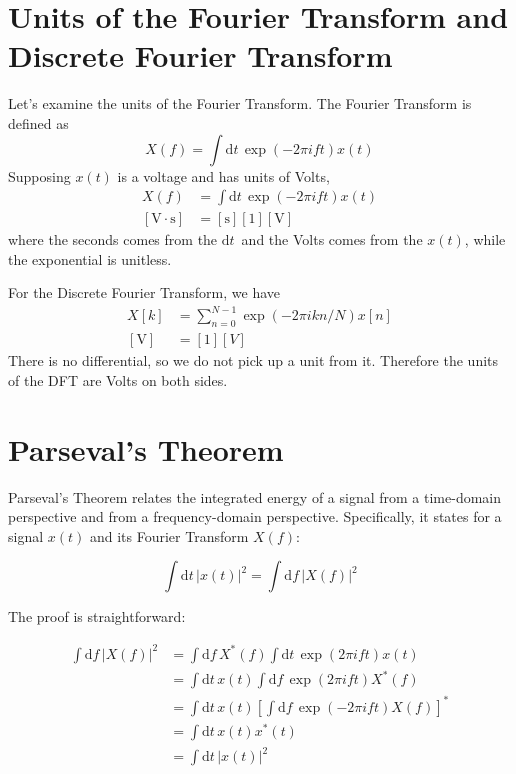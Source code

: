 \documentclass{article}
\newcommand{\dd}[1]{\mathrm{d}#1\,}
\begin{document}
\appendix
\section{Units of the Fourier Transform and Discrete Fourier Transform}\label{appendix:units}

Let's examine the units of the Fourier Transform. The Fourier Transform is
defined as
%
\[X(f) = \int \dd{t} \exp \left(-2\pi i ft\right) x(t)\]
%
Supposing \(x(t)\) is a voltage and has units of Volts,
%
\begin{align*}
    X(f) &= \int \dd{t} \exp \left(-2\pi i ft\right) x(t) \\
    \left[\mathrm{V}\cdot \mathrm{s}\right] &= \left[\mathrm{s}\right] \left[1\right] \left[\mathrm{V}\right]
\end{align*}
%
where the seconds comes from the \(\dd{t}\) and the Volts comes from the \(x(t)\),
while the exponential is unitless.

For the Discrete Fourier Transform, we have
%
\begin{align*}
    X[k] &= \sum_{n=0}^{N-1} \exp\left(-2\pi i kn/N\right) x[n] \\
    \left[\mathrm{V}\right] &= \left[1\right] \left[V\right]
\end{align*}
%
There is no differential, so we do not pick up a unit from it. Therefore the 
units of the DFT are Volts on both sides. 

\section{Parseval's Theorem}\label{appendix:parsevals}

Parseval's Theorem relates the integrated energy of a signal from a time-domain
perspective and from a frequency-domain perspective. Specifically, it states
for a signal \(x(t)\) and its Fourier Transform \(X(f)\):

\begin{equation}
    \int \dd{t} \left| x(t) \right|^2 = \int \dd{f} \left| X(f) \right|^2\label{eq:parsevals}
\end{equation}

The proof is straightforward:

\begin{align*}
    \int \dd{f} \left| X(f) \right|^2 &= \int \dd{f} X^*(f) \int \dd{t} \exp\left( 2\pi i f t \right) x(t) \\
    &= \int \dd{t} x(t) \int \dd{f} \exp\left( 2\pi i f t \right) X^*(f) \\
    &= \int \dd{t} x(t) \left[ \int \dd{f} \exp{\left( -2\pi i f t \right) X(f)} \right]^* \\
    &= \int \dd{t} x(t) x^*(t) \\
    &= \int \dd{t} \left| x(t) \right|^2
\end{align*}
\end{document}
